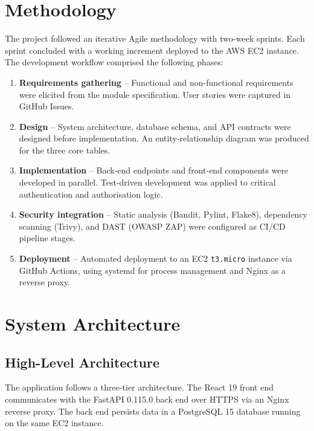 \documentclass[conference]{IEEEtran}
\begin{document}
\section{Methodology}
\label{sec:methodology}

The project followed an iterative Agile methodology with two-week sprints. Each sprint concluded with a working increment deployed to the AWS EC2 instance. The development workflow comprised the following phases:

\begin{enumerate}
    \item \textbf{Requirements gathering} -- Functional and non-functional requirements were elicited from the module specification. User stories were captured in GitHub Issues.
    \item \textbf{Design} -- System architecture, database schema, and API contracts were designed before implementation. An entity-relationship diagram was produced for the three core tables.
    \item \textbf{Implementation} -- Back-end endpoints and front-end components were developed in parallel. Test-driven development was applied to critical authentication and authorisation logic.
    \item \textbf{Security integration} -- Static analysis (Bandit, Pylint, Flake8), dependency scanning (Trivy), and DAST (OWASP ZAP) were configured as CI/CD pipeline stages.
    \item \textbf{Deployment} -- Automated deployment to an EC2 \texttt{t3.micro} instance via GitHub Actions, using systemd for process management and Nginx as a reverse proxy.
\end{enumerate}

\section{System Architecture}
\label{sec:architecture}

\subsection{High-Level Architecture}

The application follows a three-tier architecture. The React 19 front end communicates with the FastAPI 0.115.0 back end over HTTPS via an Nginx reverse proxy. The back end persists data in a PostgreSQL 15 database running on the same EC2 instance.
\end{document}
